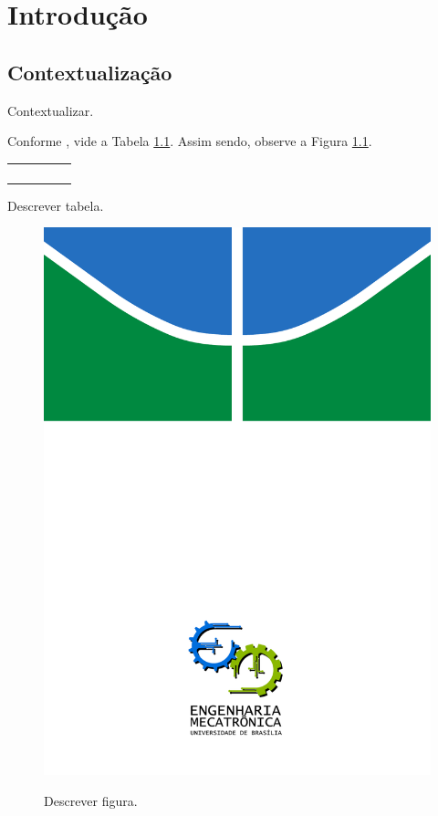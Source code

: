 
\chapter{Introdução}

\label{CapIntro}



\section{Contextualização}

Contextualizar.

Conforme \cite{article:dummy}, vide a Tabela \ref{tab:Descrever-tabela}.
Assim sendo, observe a Figura \ref{fig:Descrever-figura.}.
\begin{table}[h]
\begin{centering}
\begin{tabular}{|c|c|c|c|c|}
\hline
 &  &  &  & \tabularnewline
\hline
\hline
 &  &  &  & \tabularnewline
\hline
 &  &  &  & \tabularnewline
\hline
 &  &  &  & \tabularnewline
\hline
 &  &  &  & \tabularnewline
\hline
\end{tabular}
\par\end{centering}

\label{tab:Descrever-tabela}Descrever tabela.


\end{table}


\begin{figure}[h]
\begin{centering}
\includegraphics[width=0.4\columnwidth]{figs/capa_fundo}
\par\end{centering}

\label{fig:Descrever-figura.}Descrever figura.


\end{figure}



